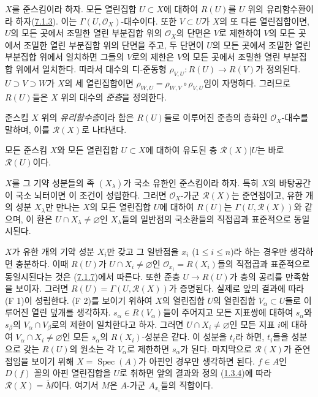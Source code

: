\begin{env}[7.3.1]
\label{I.7.3.1-ko}
$X$를 준스킴이라 하자. 모든 열린집합 $U\subset X$에 대하여 $R(U)$를
$U$ 위의 유리함수환이라 하자(\hyperref[I.7.1.3-ko]{7.1.3}). 이는
$\Gamma(U,\mathscr{O}_X)$-대수이다. 또한 $V\subset U$가 $X$의 또 다른
열린집합이면, $U$의 모든 곳에서 조밀한 열린 부분집합 위의
$\mathscr{O}_X$의 단면은 $V$로 제한하여 $V$의 모든 곳에서 조밀한
열린 부분집합 위의 단면을 주고, 두 단면이 $U$의 모든 곳에서 조밀한
열린 부분집합 위에서 일치하면 그들의 $V$로의 제한은 $V$의 모든 곳에서 조밀한
열린 부분집합 위에서 일치한다. 따라서 대수의 디-준동형
$\rho_{V,U}:R(U)\to R(V)$가 정의된다. $U\supset V\supset W$가 $X$의
세 열린집합이면
$\rho_{W,U}=\rho_{W,V}\circ\rho_{V,U}$임이 자명하다. 그러므로
$R(U)$들은 $X$ 위의 대수의 \emph{준층}을 정의한다.
\end{env}

\begin{definition}[7.3.2]
\label{I.7.3.2-ko}
준스킴 $X$ 위의 \emph{유리함수층}이라 함은 $R(U)$들로 이루어진
준층의 층화인 $\mathscr{O}_X$-대수를 말하며, 이를
$\mathscr{R}(X)$로 나타낸다.
\end{definition}

모든 준스킴 $X$와 모든 열린집합 $U\subset X$에 대하여 유도된 층
$\mathscr{R}(X)|U$는 바로 $\mathscr{R}(U)$이다.

\begin{proposition}[7.3.3]
\label{I.7.3.3-ko}
$X$를 그 기약 성분들의 족 $(X_\lambda)$가 국소 유한인 준스킴이라
하자. 특히 $X$의 바탕공간이 국소 뇌터이면 이 조건이 성립한다.
그러면 $\mathscr{O}_X$-가군 $\mathscr{R}(X)$는 준연접이고,
유한 개의 성분 $X_\lambda$만 만나는 $X$의 모든 열린집합 $U$에
대하여 $R(U)$는 $\Gamma(U,\mathscr{R}(X))$와 같으며, 이 환은
$U\cap X_\lambda\neq\varnothing$인 $X_\lambda$들의 일반점의
국소환들의 직접곱과 표준적으로 동일시된다.
\end{proposition}

$X$가 유한 개의 기약 성분 $X_i$만 갖고 그 일반점을 $x_i$
($1\leq i\leq n$)라 하는 경우만 생각하면 충분하다. 이때 $R(U)$가
$U\cap X_i\neq\varnothing$인 $\mathscr{O}_{x_i}=R(X_i)$들의
직접곱과 표준적으로 동일시된다는 것은
(\hyperref[I.7.1.7-ko]{7.1.7})에서 따른다. 또한 준층
$U\to R(U)$가 층의 공리를 만족함을 보이자. 그러면
$R(U)=\Gamma(U,\mathscr{R}(X))$가 증명된다. 실제로 앞의 결과에 따라
(F 1)이 성립한다. (F 2)를 보이기 위하여 $X$의 열린집합 $U$의
열린집합 $V_\alpha\subset U$들로 이루어진 열린 덮개를 생각하자. $s_\alpha\in R(V_\alpha)$들이
주어지고 모든 지표쌍에 대하여 $s_\alpha$와 $s_\beta$의
$V_\alpha\cap V_\beta$로의 제한이 일치한다고 하자. 그러면
$U\cap X_i\neq\varnothing$인 모든 지표 $i$에 대하여
$V_\alpha\cap X_i\neq\varnothing$인 모든 $s_\alpha$의
$R(X_i)$-성분은 같다. 이 성분을 $t_i$라 하면, $t_i$들을 성분으로
갖는 $R(U)$의 원소는 각 $V_\alpha$로 제한하면 $s_\alpha$가 된다.
마지막으로 $\mathscr{R}(X)$가 준연접임을 보이기 위해
$X=\operatorname{Spec}(A)$가 아핀인 경우만 생각하면 된다.
$f\in A$인 $D(f)$ 꼴의 아핀 열린집합을 $U$로 취하면 앞의 결과와
정의 (\hyperref[I.1.3.4-ko]{1.3.4})에 따라
$\mathscr{R}(X)=\widetilde M$이다. 여기서 $M$은 $A$-가군
$A_{x_i}$들의 직합이다.

